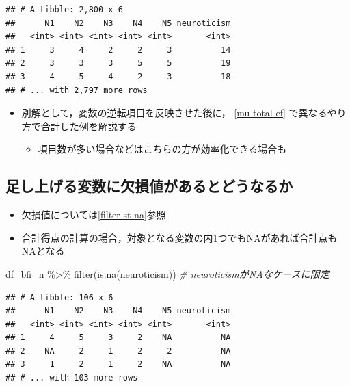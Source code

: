 \documentclass[
  xelatex,ja=standard, b5paper]{bxjsbook}
\newenvironment{Shaded}{\begin{snugshade}}{\end{snugshade}}
\newcommand{\CommentTok}[1]{\textcolor[rgb]{0.56,0.35,0.01}{\textit{#1}}}
\newcommand{\FunctionTok}[1]{\textcolor[rgb]{0.00,0.00,0.00}{#1}}
\newcommand{\NormalTok}[1]{#1}
\newcommand{\SpecialCharTok}[1]{\textcolor[rgb]{0.00,0.00,0.00}{#1}}
\providecommand{\tightlist}{%
  \setlength{\itemsep}{0pt}\setlength{\parskip}{0pt}}
\begin{document}
\begin{verbatim}
## # A tibble: 2,800 x 6
##      N1    N2    N3    N4    N5 neuroticism
##   <int> <int> <int> <int> <int>       <int>
## 1     3     4     2     2     3          14
## 2     3     3     3     5     5          19
## 3     4     5     4     2     3          18
## # ... with 2,797 more rows
\end{verbatim}

\begin{itemize}
\tightlist
\item
  別解として，変数の逆転項目を反映させた後に， \ref{mu-total-ef} で異なるやり方で合計した例を解説する

  \begin{itemize}
  \tightlist
  \item
    項目数が多い場合などはこちらの方が効率化できる場合も
  \end{itemize}
\end{itemize}

\hypertarget{mu-total-na}{%
\subsection{足し上げる変数に欠損値があるとどうなるか}\label{mu-total-na}}

\begin{itemize}
\tightlist
\item
  欠損値については\ref{filter-st-na}参照
\item
  合計得点の計算の場合，対象となる変数の内1つでもNAがあれば合計点もNAとなる
\end{itemize}

\begin{Shaded}
\begin{Highlighting}[]
\NormalTok{df\_bfi\_n }\SpecialCharTok{\%\textgreater{}\%} 
  \FunctionTok{filter}\NormalTok{(}\FunctionTok{is.na}\NormalTok{(neuroticism))     }\CommentTok{\# neuroticismがNAなケースに限定}
\end{Highlighting}
\end{Shaded}

\begin{verbatim}
## # A tibble: 106 x 6
##      N1    N2    N3    N4    N5 neuroticism
##   <int> <int> <int> <int> <int>       <int>
## 1     4     5     3     2    NA          NA
## 2    NA     2     1     2     2          NA
## 3     1     2     1     2    NA          NA
## # ... with 103 more rows
\end{verbatim}
\end{document}

